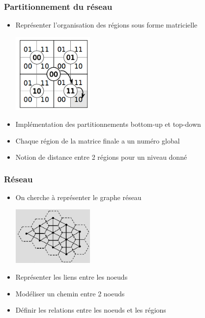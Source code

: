 \documentclass[handout]{beamer}
\begin{document}
\begin{frame}
  \frametitle<1->{Partitionnement du réseau}
    \begin{itemize}
    \item <1->{Représenter l'organisation des régions sous forme matricielle}
    \begin{center}
    \includegraphics[width=40mm]{Sous_region.jpg}
    \end{center}
    \item <2->{Implémentation des partitionnements bottom-up et top-down}%
    \item <3->{Chaque région de la matrice finale a un numéro global}%
    \item <4->{Notion de distance entre 2 régions pour un niveau donné}
    \end{itemize}
\end{frame}

\begin{frame}
  \frametitle<1->{Réseau}
    \begin{itemize}
    \item <1->{On cherche à représenter le graphe réseau}
    \begin{center}
    \includegraphics[width=40mm]{graph.jpg}
    \end{center}
    \item <2->{Représenter les liens entre les noeuds}
    \item <3->{Modéliser un chemin entre 2 noeuds}
    \item <4->{Définir les relations entre les noeuds et les régions}
    \end{itemize}
\end{frame}
\end{document}
